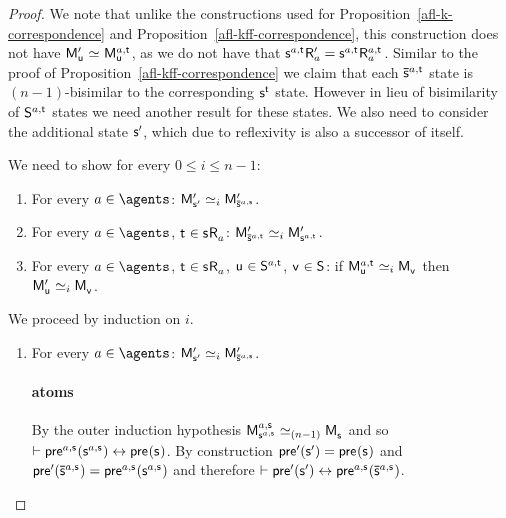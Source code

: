 \begin{proof}
    We note that unlike the constructions used for Proposition~\ref{afl-k-correspondence} and Proposition~\ref{afl-kff-correspondence}, this construction does not have $\aPModel[\prime]{\aStateU} \bisimilar \aPModel[\agentA,\aStateT]{\aStateU}$, as we do not have that 
    $\aStateS[\agentA,\aStateT] \aAccessibility[\prime]{\agentA} = \aStateS[\agentA,\aStateT] \aAccessibility[\agentA,\aStateT]{\agentA}$.
    Similar to the proof of Proposition~\ref{afl-kff-correspondence} we claim that each $\aPStateS[\agentA,\aStateT]$ state is $(n-1)$-bisimilar to the corresponding $\aStateS[\aStateT]$ state. 
    However in lieu of bisimilarity of $\aStates[\agentA,\aStateT]$ states we need another result for these states.
    We also need to consider the additional state $\aStateS[\prime]$, which due to reflexivity is also a successor of itself.

    We need to show for every $0 \leq i \leq n - 1$: 
    \begin{enumerate}
        \item For every $\agentA \in \agents$: $\aPModel[\prime]{\aStateS[\prime]} \bisimilar[i] \aPModel[\prime]{\aPStateS[\agentA,\aStateS]}$.
        \item For every $\agentA \in \agents$, $\aStateT \in \aStateS \aAccessibility{\agentA}$: $\aPModel[\prime]{\aPStateS[\agentA,\aStateT]} \bisimilar[i] \aPModel[\prime]{\aStateS[\agentA,\aStateT]}$.
        \item For every $\agentA \in \agents$, $\aStateT \in \aStateS \aAccessibility{\agentA}$, $\aStateU \in \aStates[\agentA,\aStateT]$, $\aStateV \in \aStates$: if $\aPModel[\agentA,\aStateT]{\aStateU} \bisimilar[i] \aPModel{\aStateV}$ then $\aPModel[\prime]{\aStateU} \bisimilar[i] \aPModel{\aStateV}$.
    \end{enumerate}

    We proceed by induction on $i$.

    \begin{enumerate}
        \item 
            For every $\agentA \in \agents$: $\aPModel[\prime]{\aStateS[\prime]} \bisimilar[i] \aPModel[\prime]{\aPStateS[\agentA,\aStateS]}$.

            \paragraph{atoms}

            By the outer induction hypothesis $\aPModel[\agentA,\aStateS]{\aStateS[\agentA,\aStateS]} \bisimilar[(n - 1)] \aPModel{\aStateS}$ and so $\proves \aPrecondition[\agentA,\aStateS](\aStateS[\agentA,\aStateS]) \iff \aPrecondition(\aStateS)$.
            By construction $\aPrecondition[\prime](\aStateS[\prime]) = \aPrecondition(\aStateS)$ and $\aPrecondition[\prime](\aPStateS[\agentA,\aStateS]) = \aPrecondition[\agentA,\aStateS](\aStateS[\agentA,\aStateS])$ and therefore $\proves \aPrecondition[\prime](\aStateS[\prime]) \iff \aPrecondition[\agentA,\aStateS](\aPStateS[\agentA,\aStateS])$.


\end{enumerate}
\end{proof}
